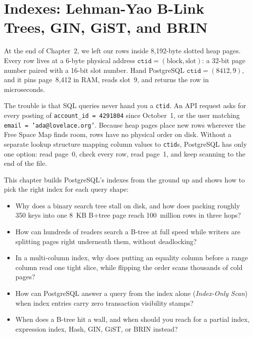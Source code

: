 \chapter{Indexes: Lehman-Yao B-Link Trees, GIN, GiST, and BRIN}
\label{ch:indexes}

At the end of Chapter~2, we left our rows inside 8,192-byte slotted heap pages. Every row lives at a 6-byte physical address $\texttt{ctid} = (\text{block}, \text{slot})$: a 32-bit page number paired with a 16-bit slot number. Hand PostgreSQL $\texttt{ctid} = (8412, 9)$, and it pins page~8,412 in RAM, reads slot~9, and returns the row in microseconds.

The trouble is that SQL queries never hand you a \texttt{ctid}. An API request asks for every posting of \texttt{account\_id = 4291804} since October~1, or the user matching \texttt{email = 'ada@lovelace.org'}. Because heap pages place new rows wherever the Free Space Map finds room, rows have no physical order on disk. Without a separate lookup structure mapping column values to \texttt{ctid}s, PostgreSQL has only one option: read page~0, check every row, read page~1, and keep scanning to the end of the file.

\begin{focusbox}
This chapter builds PostgreSQL's indexes from the ground up and shows how to pick the right index for each query shape:
\begin{itemize}
  \item Why does a binary search tree stall on disk, and how does packing roughly 350 keys into one 8~KB B+tree page reach 100~million rows in three hops?
  \item How can hundreds of readers search a B-tree at full speed while writers are splitting pages right underneath them, without deadlocking?
  \item In a multi-column index, why does putting an equality column before a range column read one tight slice, while flipping the order scans thousands of cold pages?
  \item How can PostgreSQL answer a query from the index alone (\emph{Index-Only Scan}) when index entries carry zero transaction visibility stamps?
  \item When does a B-tree hit a wall, and when should you reach for a partial index, expression index, Hash, GIN, GiST, or BRIN instead?
\end{itemize}
\end{focusbox}

\chapterline

